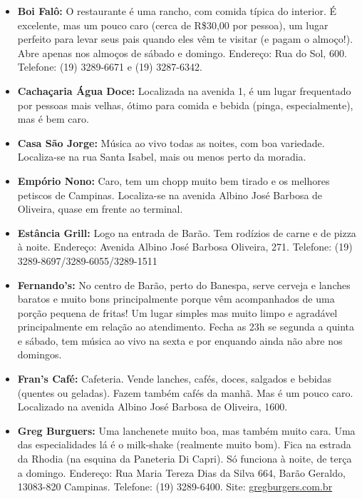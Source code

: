 \begin{itemize}
\item  \textbf{Boi Falô:} O restaurante é uma rancho, com comida típica do interior. É excelente, mas um pouco caro (cerca de R\$30,00 por pessoa), um lugar perfeito para levar seus pais quando eles vêm te visitar (e pagam o almoço!). Abre apenas nos almoços de sábado e domingo. Endereço: Rua do Sol, 600. Telefone: (19) 3289-6671 e (19) 3287-6342.

\item  \textbf{Cachaçaria Água Doce:} Localizada na avenida 1, é um lugar frequentado por pessoas mais velhas, ótimo para comida e bebida (pinga, especialmente), mas é bem caro.

\item  \textbf{Casa São Jorge:} Música ao vivo todas as noites, com boa variedade. Localiza-se na rua Santa Isabel, mais ou menos perto da moradia.

\item  \textbf{Empório Nono:} Caro, tem um chopp muito bem tirado e os melhores petiscos de Campinas. Localiza-se na avenida Albino José Barbosa de Oliveira, quase em frente ao terminal.

\item  \textbf{Estância Grill:} Logo na entrada de Barão. Tem rodízios de carne e de pizza à noite. Endereço: Avenida Albino José Barbosa Oliveira, 271. Telefone: (19) 3289-8697/3289-6055/3289-1511

\item  \textbf{Fernando's:} No centro de Barão, perto do Banespa, serve cerveja e lanches baratos e muito bons principalmente porque vêm acompanhados de uma porção pequena de fritas! Um lugar simples mas muito limpo e agradável principalmente em relação ao atendimento. Fecha as 23h se segunda a quinta e sábado, tem música ao vivo na sexta e por enquando ainda não abre nos domingos.

\item  \textbf{Fran's Café:} Cafeteria. Vende lanches, cafés, doces, salgados e bebidas (quentes ou geladas). Fazem também cafés da manhã. Mas é um pouco caro. Localizado na avenida Albino José Barbosa de Oliveira, 1600.

\item  \textbf{Greg Burguers:} Uma lanchenete muito boa, mas também muito cara. Uma das especialidades lá é o milk-shake (realmente muito bom). Fica na estrada da Rhodia (na esquina da Paneteria Di Capri). Só funciona à noite, de terça a domingo. Endereço: Rua Maria Tereza Dias da Silva 664, Barão Geraldo, 13083-820 Campinas. Telefone: (19) 3289-6400. Site: \url{gregburgers.com.br}
\end{itemize}
